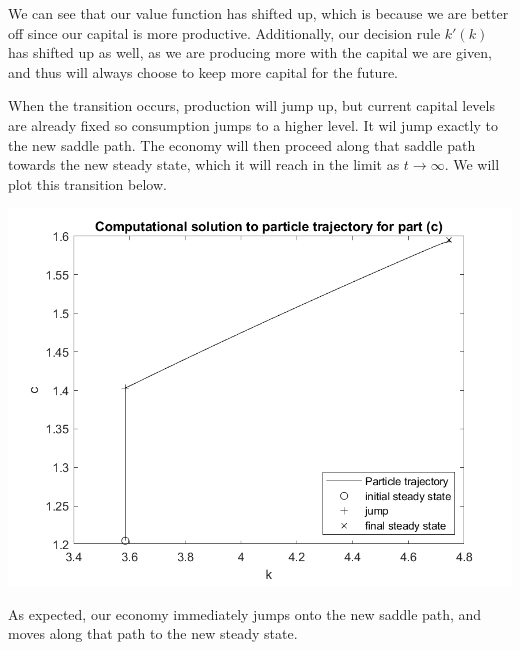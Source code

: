 \documentclass[11pt]{article} %
\begin{document}
We can see that our value function has shifted up, which is because we are better off since our capital is more productive. Additionally, our decision rule $k'(k)$ has shifted up as well, as we are producing more with the capital we are given, and thus will always choose to keep more capital for the future.

When the transition occurs, production will jump up, but current capital levels are already fixed so consumption jumps to a higher level. It wil jump exactly to the new saddle path. The economy will then proceed along that saddle path towards the new steady state, which it will reach in the limit as $t\rightarrow \infty$. We will plot this transition below.

\includegraphics{traj}

As expected, our economy immediately jumps onto the new saddle path, and moves along that path to the new steady state.
\end{document}
